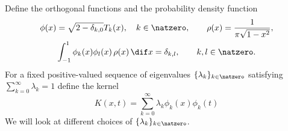 \documentclass[]{elsarticle}
\theoremstyle{definition}
\begin{document}
Define the orthogonal functions and the probability density function
\begin{gather}
\phi(x) = \sqrt{2-\delta_{k,0}} T_k(x) , \quad k \in \natzero, \qquad \rho(x) = \frac{1}{\pi\sqrt{1-x^2}}, \\
\int_{-1}^{1} \phi_k(x)\phi_{l}(x) \, \rho(x) \, \dif x = \delta_{k,l}, \qquad k,l \in \natzero.
\end{gather}
For a fixed positive-valued sequence of eigenvalues $\{\lambda_k\}_{k\in \natzero}$ satisfying $\sum_{k=0}^{\infty} \lambda_k =1$ define the kernel 
\begin{equation} \label{kerneldef}
K(x,t) = \sum_{k=0}^{\infty} \lambda_k \phi_k(x)\phi_k(t)
\end{equation}
We will look at different choices of $\{\lambda_k\}_{k\in \natzero}$.
\end{document}
